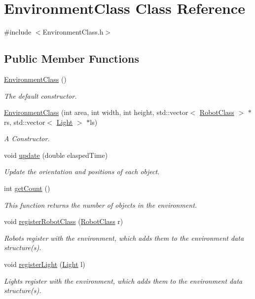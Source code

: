 \hypertarget{classEnvironmentClass}{\section{Environment\-Class Class Reference}
\label{classEnvironmentClass}
}


{\ttfamily \#include $<$Environment\-Class.\-h$>$}

\subsection*{Public Member Functions}
\begin{DoxyCompactItemize}
\item 
\hyperlink{classEnvironmentClass_aa69ad01551a79f7326f005709061ff31}{Environment\-Class} ()
\begin{DoxyCompactList}\small\item\em The default constructor. \end{DoxyCompactList}\item 
\hyperlink{classEnvironmentClass_ae109a5d616846d2341299607ce14c410}{Environment\-Class} (int area, int width, int height, std\-::vector$<$ \hyperlink{classRobotClass}{Robot\-Class} $>$ $\ast$rs, std\-::vector$<$ \hyperlink{classLight}{Light} $>$ $\ast$ls)
\begin{DoxyCompactList}\small\item\em A Constructor. \end{DoxyCompactList}\item 
void \hyperlink{classEnvironmentClass_afd86169390f7e3aadfb7b6438d220655}{update} (double elasped\-Time)
\begin{DoxyCompactList}\small\item\em Update the orientation and positions of each object. \end{DoxyCompactList}\item 
int \hyperlink{classEnvironmentClass_a77e1650c9944e5831760b4f9a9482580}{get\-Count} ()
\begin{DoxyCompactList}\small\item\em This function returns the number of objects in the environment. \end{DoxyCompactList}\item 
void \hyperlink{classEnvironmentClass_a0a45378f5cdc34807aa655c897c69050}{register\-Robot\-Class} (\hyperlink{classRobotClass}{Robot\-Class} r)
\begin{DoxyCompactList}\small\item\em Robots register with the environment, which adds them to the environment data structure(s). \end{DoxyCompactList}\item 
void \hyperlink{classEnvironmentClass_a8ba0689493810a700e46ca59c22a22c0}{register\-Light} (\hyperlink{classLight}{Light} l)
\begin{DoxyCompactList}\small\item\em Lights register with the environment, which adds them to the environment data structure(s). \end{DoxyCompactList}\end{DoxyCompactItemize}

